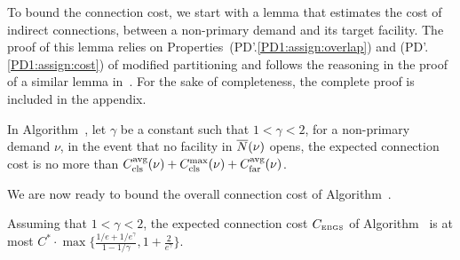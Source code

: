 
To bound the connection cost, we start with a lemma
that estimates the cost of indirect connections, between a non-primary demand and its
target facility. The proof of this lemma relies on
Properties~(PD'.\ref{PD1:assign:overlap}) and (PD'.\ref{PD1:assign:cost}) of 
modified partitioning and follows the reasoning in the proof of a similar 
lemma in~\cite{ByrkaGS10,ByrkaA10}.
For the sake of completeness, the complete proof is included in the appendix.

\begin{lemma}\label{lem: EBGS target connection cost}
  In Algorithm~{\EBGS}, let $\gamma$ be a constant such that $1 <
  \gamma < 2$, for a non-primary demand $\nu$, in the event that no
  facility in ${\overline{N}}(\nu)$ opens, the expected connection cost is no
  more than $C_{{\mbox{\scriptsize\rm cls}}}^{{\mbox{\scriptsize\rm avg}}}(\nu)+C_{{\mbox{\scriptsize\rm cls}}}^{\max}(\nu)+C_{{\mbox{\scriptsize\rm far}}}^{{\mbox{\scriptsize\rm avg}}}(\nu)$.
\end{lemma}

We are now ready to bound the overall connection cost of Algorithm~{\EBGS}.

\begin{lemma}\label{lem: EBGS connection cost}
  Assuming that $1 < \gamma < 2$, the expected connection
  cost $C_{\mbox{\tiny\rm EBGS}}$ of Algorithm~{\EBGS} is at most
  $C^\ast\cdot\max\{\frac{1/e+1/e^\gamma}{1-1/\gamma},
  1+\frac{2}{e^\gamma}\}$.
\end{lemma}

